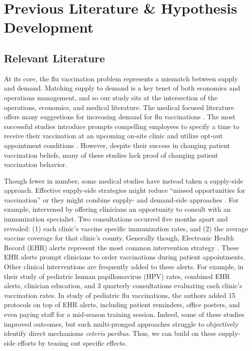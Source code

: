  
\section{Previous Literature \& Hypothesis Development} \label{HD_CC}
 \subsection{Relevant Literature}
 At its core, the flu vaccination problem represents a mismatch between supply and demand. Matching supply to demand is a key tenet of both economics and operations management, and so our study sits at the intersection of the operations, economics, and medical literature. The medical focused literature offers many suggestions for increasing demand for flu vaccinations \citep[see][]{Brewer2017}. The most successful studies introduce prompts compelling employees to specify a time to receive their vaccination at an upcoming on-site clinic \citep{Milkman2011} and utilize opt-out appointment conditions \citep{Chapman2010,Chapman2016}. However, despite their success in changing patient vaccination beliefs, many of these studies lack proof of changing patient vaccination behavior.
	
 Though fewer in number, some medical studies have instead taken a supply-side approach. Effective supply-side strategies might reduce “missed opportunities for vaccination” \citep{Jaca2018} or they might combine supply- and demand-side approaches \citep{Smulian2016}. For example, \cite{Gilkey2014} intervened by offering clinicians an opportunity to consult with an immunization specialist. Two consultations occurred five months apart and revealed: (1) each clinic’s vaccine specific immunization rates, and (2) the average vaccine coverage for that clinic’s county. Generally though, Electronic Health Record (EHR) alerts represent the most common intervention strategy \citep{Fiks2009,Fiks2013,Zimmerman2014,Szilagyi2015,RuffinIV2015,Lin2016,Patel2017}. These EHR alerts prompt clinicians to order vaccinations during patient appointments. Other clinical interventions are frequently added to these alerts. For example, in their study of pediatric human papillomavirus (HPV) rates, \cite{Fiks2013} combined EHR alerts, clinician education, and 3 quarterly consultations evaluating each clinic’s vaccination rates. In \cite{Zimmerman2014} study of pediatric flu vaccinations, the authors added 15 protocols on top of EHR alerts, including patient reminders, office posters, and even paying staff for a mid-season training session. Indeed, some of these studies improved outcomes, but such multi-pronged approaches struggle to objectively identify direct mechanisms \textit{ceteris paribus}. Thus, we can build on these supply-side efforts by teasing out specific effects.
	
